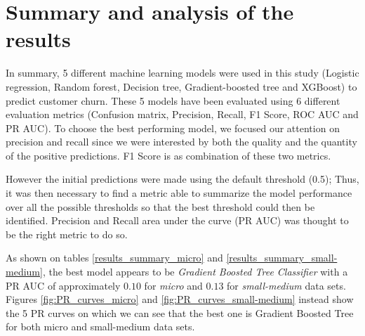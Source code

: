 \documentclass[LaM,binding=0.6cm, english]{sapthesis}
\begin{document}
\section{Summary and analysis of the results}

In summary, 5 different machine learning models were used in this study (Logistic regression, Random forest, Decision tree, Gradient-boosted tree and XGBoost) to predict customer churn. These 5 models have been evaluated using 6 different evaluation metrics (Confusion matrix, Precision, Recall, F1 Score, ROC AUC and PR AUC). To choose the best performing model, we focused our attention on precision and recall since we were interested by both the quality and the quantity of the positive predictions. F1 Score is as combination of these two metrics. 

However the initial predictions were made using the default threshold (0.5); Thus, it was then necessary to find a metric able to summarize the model performance over all the possible thresholds so that the best threshold could then be identified. Precision and Recall area under the curve (PR AUC) was thought to be the right metric to do so.

As shown on tables \ref{results_summary_micro} and \ref{results_summary_small-medium}, the best model appears to be \textit{Gradient Boosted Tree Classifier} with a PR AUC of approximately $0.10$ for \textit{micro} and $0.13$ for \textit{small-medium} data sets. Figures \ref{fig:PR_curves_micro} and \ref{fig:PR_curves_small-medium} instead show the 5 PR curves on which we can see that the best one is Gradient Boosted Tree for both micro and small-medium data sets.


\begin{table}[!ht]
\centering
{}
\vspace{2mm}
\caption{Results summary (Micro)}
\label{results_summary_micro}
\end{table}
\end{document}
